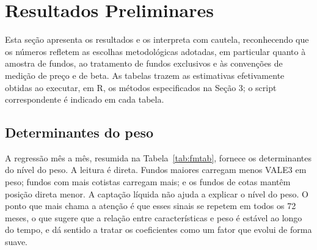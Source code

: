 \documentclass[12pt,a4paper]{article}
\begin{document}
\section{Resultados Preliminares}

Esta seção apresenta os resultados e os interpreta com cautela, reconhecendo que os números
refletem as escolhas metodológicas adotadas, em particular quanto à amostra de fundos, ao
tratamento de fundos exclusivos e às convenções de medição de preço e de beta. As tabelas trazem
as estimativas efetivamente obtidas ao executar, em R, os métodos especificados na Seção 3; o
script correspondente é indicado em cada tabela.

\subsection{Determinantes do peso}
\label{sec:det}

A regressão mês a mês, resumida na Tabela~\ref{tab:fmtab}, fornece os determinantes do nível do
peso. A leitura é direta. Fundos maiores carregam menos VALE3 em peso; fundos com mais cotistas
carregam mais; e os fundos de cotas mantêm posição direta menor. A captação líquida não ajuda a
explicar o nível do peso. O ponto que mais chama a atenção é que esses sinais se repetem em todos
os 72 meses, o que sugere que a relação entre características e peso é estável ao longo do tempo, e
dá sentido a tratar os coeficientes como um fator que evolui de forma suave.
\end{document}
